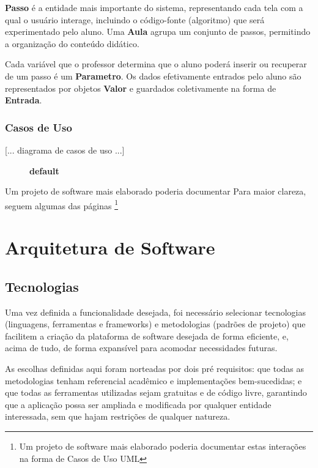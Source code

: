 \documentclass{abnt}
\begin{document}
\textbf{Passo} é a entidade mais importante do sistema, representando cada tela com a qual o usuário interage, incluindo o código-fonte (algoritmo) que será experimentado pelo aluno. Uma \textbf{Aula} agrupa um conjunto de passos, permitindo a organização do conteúdo didático.

Cada variável que o professor determina que o aluno poderá inserir ou recuperar de um passo é um \textbf{Parametro}. Os dados efetivamente entrados pelo aluno são representados por objetos \textbf{Valor} e guardados coletivamente na forma de \textbf{Entrada}.

\subsection{Casos de Uso}

[... diagrama de casos de uso ...]

\begin{figure}[htbp]
\begin{center}
\caption{{\bf default}}
\label{default}
\end{center}
\end{figure}


Um projeto de software mais elaborado poderia documentar 
Para maior clareza, seguem algumas das páginas \footnote{Um projeto de software mais elaborado poderia documentar estas interações na forma de Casos de Uso UML\cite{}}

\chapter {Arquitetura de Software}



\section{Tecnologias}
Uma vez definida a funcionalidade desejada, foi necessário selecionar tecnologias (linguagens, ferramentas e frameworks) e metodologias (padrões de projeto) que facilitem a criação da plataforma de software desejada de forma eficiente, e, acima de tudo, de forma expansível para acomodar necessidades futuras.

As escolhas definidas aqui foram norteadas por dois pré requisitos: que todas as metodologias tenham referencial acadêmico e implementações bem-sucedidas; e que todas as ferramentas utilizadas sejam gratuitas e de código livre, garantindo que a aplicação  possa ser ampliada e modificada por qualquer entidade interessada, sem que hajam restrições de qualquer natureza.
\end{document}
